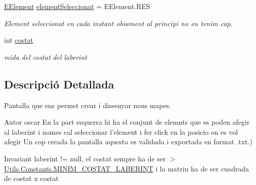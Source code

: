 \begin{DoxyCompactItemize}
\item 
\hypertarget{classinterficie_1_1_f_editor_laberint_a14f74353d741135f938b73fd5a32b7ef}{\hyperlink{enumlogica_1_1enumeracions_1_1_e_element}{E\+Element} \hyperlink{classinterficie_1_1_f_editor_laberint_a14f74353d741135f938b73fd5a32b7ef}{element\+Seleccionat} = E\+Element.\+R\+E\+S}\label{classinterficie_1_1_f_editor_laberint_a14f74353d741135f938b73fd5a32b7ef}

\begin{DoxyCompactList}\small\item\em Element seleccionat en cada instant obiament al principi no en tenim cap. \end{DoxyCompactList}\item 
\hypertarget{classinterficie_1_1_f_editor_laberint_a8715aa165dbd6c01e0f4470a4b11fca6}{int \hyperlink{classinterficie_1_1_f_editor_laberint_a8715aa165dbd6c01e0f4470a4b11fca6}{costat}}\label{classinterficie_1_1_f_editor_laberint_a8715aa165dbd6c01e0f4470a4b11fca6}

\begin{DoxyCompactList}\small\item\em mida del costat del laberint \end{DoxyCompactList}\end{DoxyCompactItemize}


\subsection{Descripció Detallada}
Pantalla que ens permet crear i dissenyar nous mapes. 

\begin{DoxyAuthor}{Autor}
oscar En la part esquerra hi ha el conjunt de elemnts que es poden afegir al laberint i nomes cal seleccionar l'element i fer click en la posicio on es vol afegir Un cop creada la pantalla aquesta es validada i exportada en format .txt.)
\end{DoxyAuthor}
\begin{DoxyInvariant}{Invariant}
laberint != null, el costat sempre ha de ser $>$ \hyperlink{classlogica_1_1_utils_1_1_constants_af0255617e604b0757200f05de64fa934}{Utils.\+Constants.\+M\+I\+N\+I\+M\+\_\+\+C\+O\+S\+T\+A\+T\+\_\+\+L\+A\+B\+E\+R\+I\+N\+T} i la matriu ha de ser cuadrada de costat x costat 
\end{DoxyInvariant}


